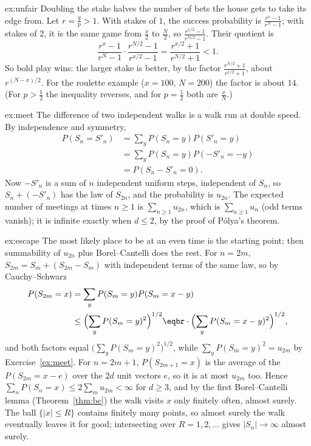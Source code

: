 \begin{solution}{ex:unfair}
\idea Doubling the stake halves the number of bets the house gets to take its edge from.
\writeup Let $r=\frac qp>1$. With stakes of $1$, the success probability is $\frac{r^x-1}{r^N-1}$; with stakes of $2$, it is the same game from $\frac x2$ to
$\frac N2$, so $\frac{r^{x/2}-1}{r^{N/2}-1}$. Their quotient is
\[
\frac{r^x-1}{r^N-1}\cdot\frac{r^{N/2}-1}{r^{x/2}-1}=\frac{r^{x/2}+1}{r^{N/2}+1}<1.
\]
So bold play wins: the larger stake is better, by the factor $\frac{r^{N/2}+1}{r^{x/2}+1}$, about $r^{(N-x)/2}$. For the roulette example ($x=100$, $N=200$) the
factor is about $14$. (For $p>\frac12$ the inequality reverses, and for $p=\frac12$ both are $\frac xN$.)
\end{solution}

\begin{solution}{ex:meet}
\idea The difference of two independent walks is a walk run at double speed.
\writeup By independence and symmetry,
\[
\begin{aligned}P(S_n=S'_n)&=\sum_yP(S_n=y)P(S'_n=y)\\&=\sum_yP(S_n=y)P(-S'_n=-y)\\&=P(S_n-S'_n=0).\end{aligned}
\]
Now $-S'_n$ is a sum of $n$ independent uniform steps, independent of $S_n$, so $S_n+(-S'_n)$ has the law of $S_{2n}$, and the probability is $u_{2n}$.
The expected number of meetings at times $n\ge1$ is $\sum_{n\ge1}u_{2n}$, which is $\sum_{n\ge1}u_n$ (odd terms vanish); it is infinite exactly when $d\le2$, by
the proof of Pólya's theorem.
\end{solution}

\begin{solution}{ex:escape}
\idea The most likely place to be at an even time is the starting point; then summability of $u_{2n}$ plus Borel--Cantelli does the rest.
\writeup For $n=2m$, $S_{2m}=S_m+(S_{2m}-S_m)$ with independent terms of the same law, so by Cauchy--Schwarz
\[
\begin{aligned}P(S_{2m}=x)&=\sum_yP(S_m=y)P(S_m=x-y)\\&\le\Bigl(\sum_yP(S_m=y)^2\Bigr)^{1/2}\eqbr\cdot\Bigl(\sum_yP(S_m=x-y)^2\Bigr)^{1/2},\end{aligned}
\]
and both factors equal $\bigl(\sum_yP(S_m=y)^2\bigr)^{1/2}$, while $\sum_yP(S_m=y)^2=u_{2m}$ by Exercise~\ref{ex:meet}. For $n=2m+1$, $P(S_{2m+1}=x)$ is the average of the
$P(S_{2m}=x-e)$ over the $2d$ unit vectors $e$, so it is at most $u_{2m}$ too. Hence $\sum_nP(S_n=x)\le2\sum_mu_{2m}<\infty$ for $d\ge3$, and by the first
Borel--Cantelli lemma (Theorem~\ref{thm:bc}) the walk visits $x$ only finitely often, almost surely. The ball $\{|x|\le R\}$ contains finitely many
points, so almost surely the walk eventually leaves it for good; intersecting over $R=1,2,\ldots$ gives $|S_n|\to\infty$ almost surely.
\end{solution}

